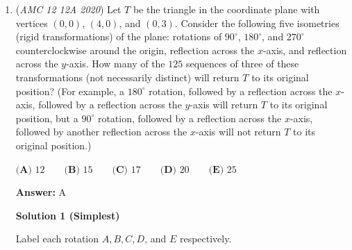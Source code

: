 \begin{enumerate}
 Therefore, the product contains exactly $8\cdot17=136$ distinct powers of $2$.

 Finally, the extra $1=2^0$ contributes one more distinct power of $2$.

 Thus, the answer is

 
 \[\boxed{8\cdot17+1=137}.\]




\textbf{Solution 9 (Intermediate Value Theorem, Cheese)}

Notice that A, C, and D are all odd integers while B and E are not. Notice that $117<137<273$. Thus, according to the intermediate value theorem of guessing, the answer is $\boxed{\textbf{(C) }137}$

 Important Note: IVT does not apply to answers which are consecutive integers because parity distinction is irrelevant (special case).

 Note following Important Note: There are a lot more cases.

 \href{https://artofproblemsolving.com/videos/amc/2020amc10a/511}{https://artofproblemsolving.com/videos/amc/2020amc10a/511}

 


	\item (\textit{AMC 12 12A 2020}) Let $T$ be the triangle in the coordinate plane with vertices $\left(0,0\right)$, $\left(4,0\right)$, and $\left(0,3\right)$. Consider the following five isometries (rigid transformations) of the plane: rotations of $90^{\circ}$, $180^{\circ}$, and $270^{\circ}$ counterclockwise around the origin, reflection across the $x$-axis, and reflection across the $y$-axis. How many of the $125$ sequences of three of these transformations (not necessarily distinct) will return $T$ to its original position? (For example, a $180^{\circ}$ rotation, followed by a reflection across the $x$-axis, followed by a reflection across the $y$-axis will return $T$ to its original position, but a $90^{\circ}$ rotation, followed by a reflection across the $x$-axis, followed by another reflection across the $x$-axis will not return $T$ to its original position.)


 $\textbf{(A) } 12\qquad\textbf{(B) } 15\qquad\textbf{(C) }17 \qquad\textbf{(D) }20 \qquad\textbf{(E) }25$

 \textbf{Answer: }A



\textbf{Solution 1 (Simplest)}

Label each rotation \( A, B, C, D \), and \( E \) respectively.


\end{enumerate}
